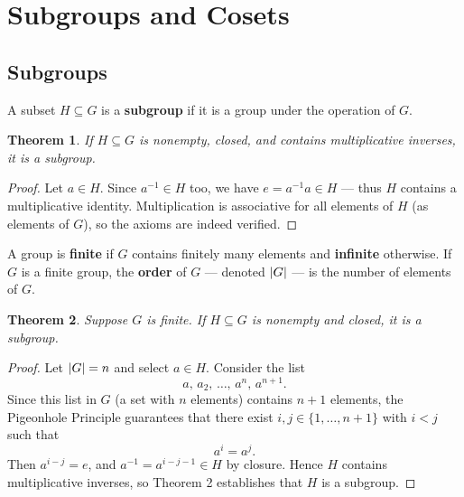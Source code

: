 \documentclass[11pt]{article}
\newtheorem{theorem}{Theorem}
\begin{document}

\section{Subgroups and Cosets}


\subsection{Subgroups}

A subset $H \subseteq G$ is a \textbf{subgroup} if it is a group under the operation of $G$.

\begin{adjustwidth}{0.5cm}{}
  \begin{theorem}
    If $H \subseteq G$ is nonempty, closed, and contains multiplicative inverses, it is a subgroup.
  \end{theorem}
  \begin{proof}
    Let $a \in H$. Since $a^{-1} \in H$ too, we have $e = a^{-1}a \in H$ --- thus $H$ contains a multiplicative identity. Multiplication is associative for all elements of $H$ (as elements of $G$), so the axioms are indeed verified.
  \end{proof}
\end{adjustwidth}

A group is \textbf{finite} if $G$ contains finitely many elements and \textbf{infinite} otherwise. If $G$ is a finite group, the \textbf{order} of $G$ --- denoted $\abs{G}$ --- is the number of elements of $G$.

\begin{adjustwidth}{0.5cm}{}
  \begin{theorem}
    Suppose $G$ is finite. If $H \subseteq G$ is nonempty and closed, it is a subgroup.
  \end{theorem}
  \begin{proof}
    Let $\abs{G} = n$ and select $a \in H$. Consider the list
    \[
      a, \, a_{2}, \, \ldots, \, a^{n}, \, a^{n + 1}.
    \]
    Since this list in $G$ (a set with $n$ elements) contains $n + 1$ elements, the Pigeonhole Principle guarantees that there exist $i, j \in \{ 1, \ldots, n + 1 \}$ with $i < j$ such that
    \[
      a^{i} = a^{j}.
    \]
    Then $a^{i - j} = e$, and $a^{-1} = a^{i - j - 1} \in H$ by closure. Hence $H$ contains multiplicative inverses, so Theorem 2 establishes that $H$ is a subgroup.
  \end{proof}
\end{adjustwidth}
\end{document}
